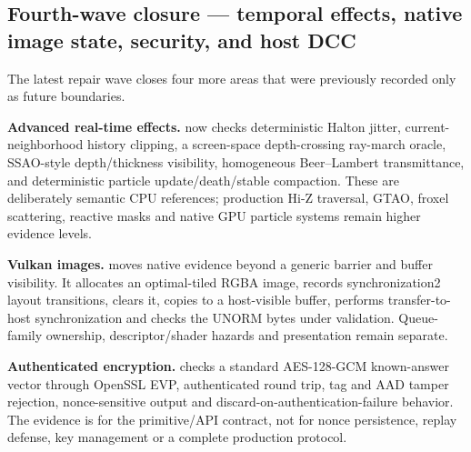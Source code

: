 \subsection{Fourth-wave closure --- temporal effects, native image state, security, and host DCC}\label{appendix-2358b21a702d-fourth-wave-closure-temporal-effects-native-image-state-security-and-host-dcc}

\hypertarget{appendix-2358b21a702d-fourth-wave-closure-temporal-effects-native-image-state-security-and-host-dcc}{}

The latest repair wave closes four more areas that were previously recorded only as future boundaries.

\textbf{Advanced real-time effects.}  now checks deterministic Halton jitter, current-neighborhood history clipping, a screen-space depth-crossing ray-march oracle, SSAO-style depth/thickness visibility, homogeneous Beer--Lambert transmittance, and deterministic particle update/death/stable compaction. These are deliberately semantic CPU references; production Hi-Z traversal, GTAO, froxel scattering, reactive masks and native GPU particle systems remain higher evidence levels.

\textbf{Vulkan images.}  moves native evidence beyond a generic barrier and buffer visibility. It allocates an optimal-tiled RGBA image, records  synchronization2 layout transitions, clears it, copies to a host-visible buffer, performs transfer-to-host synchronization and checks the UNORM bytes under validation. Queue-family ownership, descriptor/shader hazards and presentation remain separate.

\textbf{Authenticated encryption.}  checks a standard AES-128-GCM known-answer vector through OpenSSL EVP, authenticated round trip, tag and AAD tamper rejection, nonce-sensitive output and discard-on-authentication-failure behavior. The evidence is for the primitive/API contract, not for nonce persistence, replay defense, key management or a complete production protocol.

